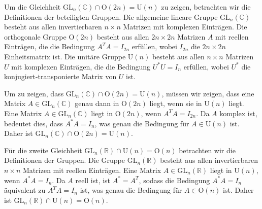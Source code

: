 Um die Gleichheit $\mathrm{GL}_n(\mathbb{C}) \cap \mathrm{O}(2n) = \mathrm{U}(n)$ zu zeigen, betrachten wir die Definitionen der beteiligten Gruppen. Die allgemeine lineare Gruppe $\mathrm{GL}_n(\mathbb{C})$ besteht aus allen invertierbaren $n \times n$ Matrizen mit komplexen Einträgen. Die orthogonale Gruppe $\mathrm{O}(2n)$ besteht aus allen $2n \times 2n$ Matrizen $A$ mit reellen Einträgen, die die Bedingung $A^T A = I_{2n}$ erfüllen, wobei $I_{2n}$ die $2n \times 2n$ Einheitsmatrix ist. Die unitäre Gruppe $\mathrm{U}(n)$ besteht aus allen $n \times n$ Matrizen $U$ mit komplexen Einträgen, die die Bedingung $U^* U = I_n$ erfüllen, wobei $U^*$ die konjugiert-transponierte Matrix von $U$ ist.

Um zu zeigen, dass $\mathrm{GL}_n(\mathbb{C}) \cap \mathrm{O}(2n) = \mathrm{U}(n)$, müssen wir zeigen, dass eine Matrix $A \in \mathrm{GL}_n(\mathbb{C})$ genau dann in $\mathrm{O}(2n)$ liegt, wenn sie in $\mathrm{U}(n)$ liegt. Eine Matrix $A \in \mathrm{GL}_n(\mathbb{C})$ liegt in $\mathrm{O}(2n)$, wenn $A^T A = I_{2n}$. Da $A$ komplex ist, bedeutet dies, dass $A^* A = I_n$, was genau die Bedingung für $A \in \mathrm{U}(n)$ ist. Daher ist $\mathrm{GL}_n(\mathbb{C}) \cap \mathrm{O}(2n) = \mathrm{U}(n)$.

Für die zweite Gleichheit $\mathrm{GL}_n(\mathbb{R}) \cap \mathrm{U}(n) = \mathrm{O}(n)$ betrachten wir die Definitionen der Gruppen. Die Gruppe $\mathrm{GL}_n(\mathbb{R})$ besteht aus allen invertierbaren $n \times n$ Matrizen mit reellen Einträgen. Eine Matrix $A \in \mathrm{GL}_n(\mathbb{R})$ liegt in $\mathrm{U}(n)$, wenn $A^* A = I_n$. Da $A$ reell ist, ist $A^* = A^T$, sodass die Bedingung $A^* A = I_n$ äquivalent zu $A^T A = I_n$ ist, was genau die Bedingung für $A \in \mathrm{O}(n)$ ist. Daher ist $\mathrm{GL}_n(\mathbb{R}) \cap \mathrm{U}(n) = \mathrm{O}(n)$.